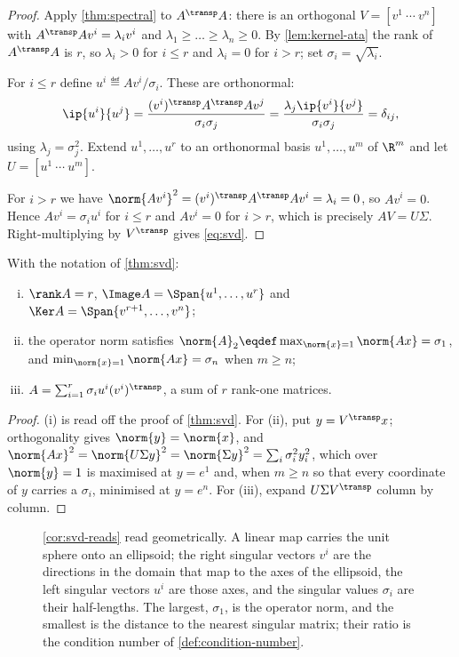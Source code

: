 \begin{proof}
	Apply \autoref{thm:spectral} to $A^{\transp}A$: there is an orthogonal
	$V=[v^1\ \cdots\ v^n]$ with $A^{\transp}Av^i=\lambda_iv^i$ and
	$\lambda_1\geq\dots\geq\lambda_n\geq0$. By \autoref{lem:kernel-ata} the rank of
	$A^{\transp}A$ is $r$, so $\lambda_i>0$ for $i\leq r$ and $\lambda_i=0$ for
	$i>r$; set $\sigma_i=\sqrt{\lambda_i}$.

	For $i\leq r$ define $u^i\eqdef Av^i/\sigma_i$. These are orthonormal:
	\[
		\ip{u^i}{u^j}=\frac{(v^i)^{\transp}A^{\transp}Av^j}{\sigma_i\sigma_j}
		=\frac{\lambda_j\ip{v^i}{v^j}}{\sigma_i\sigma_j}
		=\delta_{ij},
	\]
	using $\lambda_j=\sigma_j^2$. Extend $u^1,\dots,u^r$ to an orthonormal basis
	$u^1,\dots,u^m$ of $\R^m$ and let $U=[u^1\ \cdots\ u^m]$.

	For $i>r$ we have $\norm{Av^i}^2=(v^i)^{\transp}A^{\transp}Av^i=\lambda_i=0$,
	so $Av^i=0$. Hence $Av^i=\sigma_iu^i$ for $i\leq r$ and $Av^i=0$ for $i>r$,
	which is precisely $AV=U\Sigma$. Right-multiplying by $V^{\transp}$ gives
	\eqref{eq:svd}.
\end{proof}

\begin{corollary}\label{cor:svd-reads}
	With the notation of \autoref{thm:svd}:
	\begin{enumerate}[(i)]
		\item $\rank A=r$, $\Image A=\Span\{u^1,\dots,u^r\}$ and
		      $\Ker A=\Span\{v^{r+1},\dots,v^n\}$;
		\item the operator norm satisfies
		      $\norm{A}_{2}\eqdef\max_{\norm{x}=1}\norm{Ax}=\sigma_1$, and
		      $\min_{\norm{x}=1}\norm{Ax}=\sigma_n$ when $m\geq n$;
		\item $A=\sum_{i=1}^{r}\sigma_iu^i(v^i)^{\transp}$, a sum of $r$ rank-one
		      matrices.
	\end{enumerate}
\end{corollary}

\begin{proof}
	(i) is read off the proof of \autoref{thm:svd}. For (ii), put $y=V^{\transp}x$;
	orthogonality gives $\norm{y}=\norm{x}$, and
	$\norm{Ax}^2=\norm{U\Sigma y}^2=\norm{\Sigma y}^2=\sum_{i}\sigma_i^2y_i^2$,
	which over $\norm{y}=1$ is maximised at $y=e^1$ and, when $m\geq n$ so that
	every coordinate of $y$ carries a $\sigma_i$, minimised at $y=e^n$. For (iii),
	expand $U\Sigma V^{\transp}$ column by column.
\end{proof}

\begin{figure}[htbp]
	\centering
	
	\caption[The singular value decomposition as a distortion of the unit
		sphere]{%
		\autoref{cor:svd-reads} read geometrically. A linear map carries the unit
		sphere onto an ellipsoid; the right singular vectors $v^i$ are the
		directions in the domain that map to the axes of the ellipsoid, the left
		singular vectors $u^i$ are those axes, and the singular values $\sigma_i$
		are their half-lengths. The largest, $\sigma_1$, is the operator norm, and
		the smallest is the distance to the nearest singular matrix; their ratio is
		the condition number of \autoref{def:condition-number}.}
	\label{fig:svd-ellipse}
\end{figure}

